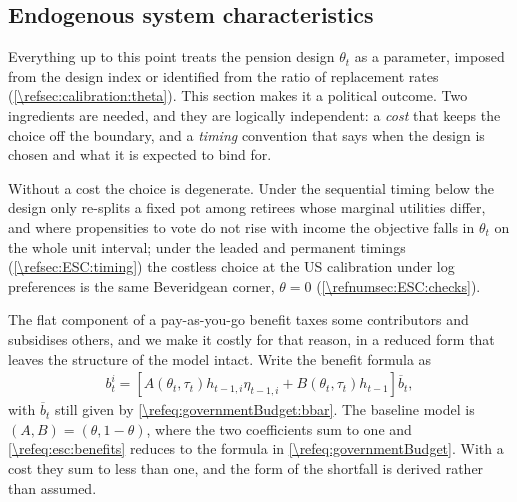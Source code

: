 \subsection{Endogenous system characteristics}\label{\refsec:ESC}
Everything up to this point treats the pension design $\theta_t$ as a parameter, imposed from the design index or identified from the ratio of replacement rates (\cref{\refsec:calibration:theta}). This section makes it a political outcome. Two ingredients are needed, and they are logically independent: a \emph{cost} that keeps the choice off the boundary, and a \emph{timing} convention that says when the design is chosen and what it is expected to bind for.

Without a cost the choice is degenerate. Under the sequential timing below the design only re-splits a fixed pot among retirees whose marginal utilities differ, and where propensities to vote do not rise with income the objective falls in $\theta_t$ on the whole unit interval; under the leaded and permanent timings (\cref{\refsec:ESC:timing}) the costless choice at the US calibration under log preferences is the same Beveridgean corner, $\theta = 0$ (\cref{\refnumsec:ESC:checks}).


The flat component of a pay-as-you-go benefit taxes some contributors and subsidises others, and we make it costly for that reason, in a reduced form that leaves the structure of the model intact. Write the benefit formula as
\begin{align}\label{\refeq:esc:benefits}
    b_t^i = \left[A(\theta_t,\tau_t)h_{t-1,i}\eta_{t-1,i} + B(\theta_t,\tau_t)h_{t-1}\right]\overline{b}_t,
\end{align}
with $\overline{b}_t$ still given by \eqref{\refeq:governmentBudget:bbar}. The baseline model is $\left(A,B\right) = \left(\theta,1-\theta\right)$, where the two coefficients sum to one and \eqref{\refeq:esc:benefits} reduces to the formula in \eqref{\refeq:governmentBudget}. With a cost they sum to less than one, and the form of the shortfall is derived rather than assumed.

